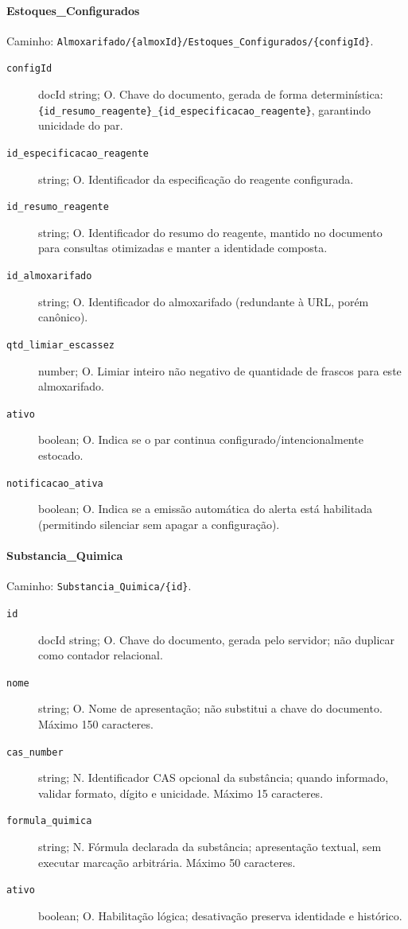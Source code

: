 \paragraph{Estoques\_Configurados}\mbox{}\par
Caminho: \texttt{Almoxarifado/\{almoxId\}/Estoques\_Configurados/\{configId\}}.
\begin{description}
\item[\texttt{configId}] docId string; O. Chave do documento, gerada de forma determinística: \texttt{\{id\_resumo\_reagente\}\_\{id\_especificacao\_reagente\}}, garantindo unicidade do par.
\item[\texttt{id\_especificacao\_reagente}] string; O. Identificador da especificação do reagente configurada.
\item[\texttt{id\_resumo\_reagente}] string; O. Identificador do resumo do reagente, mantido no documento para consultas otimizadas e manter a identidade composta.
\item[\texttt{id\_almoxarifado}] string; O. Identificador do almoxarifado (redundante à URL, porém canônico).
\item[\texttt{qtd\_limiar\_escassez}] number; O. Limiar inteiro não negativo de quantidade de frascos para este almoxarifado.
\item[\texttt{ativo}] boolean; O. Indica se o par continua configurado/intencionalmente estocado.
\item[\texttt{notificacao\_ativa}] boolean; O. Indica se a emissão automática do alerta está habilitada (permitindo silenciar sem apagar a configuração).
\end{description}

\paragraph{Substancia\_Quimica}\mbox{}\par
Caminho: \texttt{Substancia\_Quimica/\{id\}}.
\begin{description}
\item[\texttt{id}] docId string; O. Chave do documento, gerada pelo servidor; não duplicar como contador relacional.
\item[\texttt{nome}] string; O. Nome de apresentação; não substitui a chave do documento. Máximo 150 caracteres.
\item[\texttt{cas\_number}] string; N. Identificador CAS opcional da substância; quando informado, validar formato, dígito e unicidade. Máximo 15 caracteres.
\item[\texttt{formula\_quimica}] string; N. Fórmula declarada da substância; apresentação textual, sem executar marcação arbitrária. Máximo 50 caracteres.
\item[\texttt{ativo}] boolean; O. Habilitação lógica; desativação preserva identidade e histórico.
\end{description}

